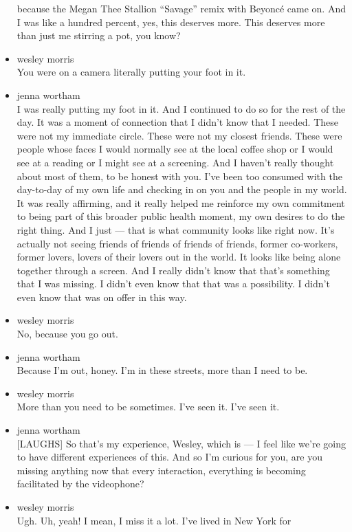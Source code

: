 \begin{itemize}
  because the Megan Thee Stallion ``Savage'' remix with Beyoncé came on.
  And I was like a hundred percent, yes, this deserves more. This
  deserves more than just me stirring a pot, you know?
\item
  wesley morris\\
  You were on a camera literally putting your foot in it.
\item
  jenna wortham\\
  I was really putting my foot in it. And I continued to do so for the
  rest of the day. It was a moment of connection that I didn't know that
  I needed. These were not my immediate circle. These were not my
  closest friends. These were people whose faces I would normally see at
  the local coffee shop or I would see at a reading or I might see at a
  screening. And I haven't really thought about most of them, to be
  honest with you. I've been too consumed with the day-to-day of my own
  life and checking in on you and the people in my world. It was really
  affirming, and it really helped me reinforce my own commitment to
  being part of this broader public health moment, my own desires to do
  the right thing. And I just --- that is what community looks like
  right now. It's actually not seeing friends of friends of friends of
  friends, former co-workers, former lovers, lovers of their lovers out
  in the world. It looks like being alone together through a screen. And
  I really didn't know that that's something that I was missing. I
  didn't even know that that was a possibility. I didn't even know that
  was on offer in this way.
\item
  wesley morris\\
  No, because you go out.
\item
  jenna wortham\\
  Because I'm out, honey. I'm in these streets, more than I need to be.
\item
  wesley morris\\
  More than you need to be sometimes. I've seen it. I've seen it.
\item
  jenna wortham\\
  {[}LAUGHS{]} So that's my experience, Wesley, which is --- I feel like
  we're going to have different experiences of this. And so I'm curious
  for you, are you missing anything now that every interaction,
  everything is becoming facilitated by the videophone?
\item
  wesley morris\\
  Ugh. Uh, yeah! I mean, I miss it a lot. I've lived in New York for

\end{itemize}
